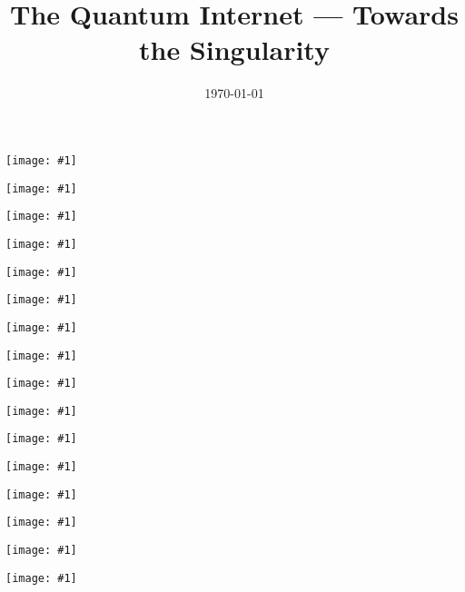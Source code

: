 \documentclass[aps, rmp, twocolumn, amsmath, amssymb, nofootinbib, superscriptaddress, longbibliography, floatfix, table-of-contents, eqsecnum]{revtex4-1}
\newcommand{\sketch}[1]{\begin{center}\texttt{[image: \#1]}\end{center}}
\begin{document}
\title{The Quantum Internet --- Towards the Singularity}



\date{\today}

\frenchspacing



\maketitle

\makeatletter
\def\l@paragraph{\@dottedtocline{4}{8em}{1.2em}}
\makeatother

\makeatletter
{}
\makeatother

\tableofcontents 
{}



\sketch{sketch_1}


\sketch{sketch_2}


\sketch{sketch_3}


\sketch{sketch_4}


\sketch{sketch_5}


\sketch{sketch_6}


\sketch{sketch_7}


\sketch{sketch_8}


\sketch{sketch_9}


\sketch{sketch_10}


\sketch{sketch_11}


\sketch{sketch_12}


\sketch{sketch_13}


\sketch{sketch_14}


\sketch{sketch_37}


\sketch{sketch_15}

\end{document}
